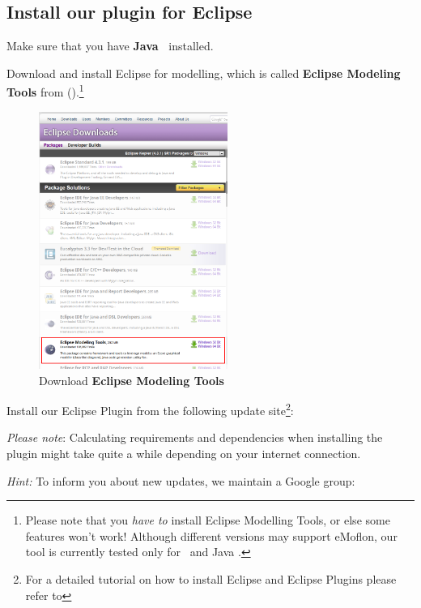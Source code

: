 \genHeader
\hypertarget{installPlugin common}{} 
\subsection{Install our plugin for Eclipse}
 
\vspace{0.5cm}
 
\begin{stepbystep}

\item  Make sure that you have \textbf{Java~\JavaVersion{}} installed.
 
\item  Download and install Eclipse \EclipseVersion for modelling, which is called \textbf{Eclipse Modeling Tools} from \EclipseDownloadLink ().\footnote{Please
note that you \emph{have to} install Eclipse Modelling Tools, or else some features won't work! Although different versions may support eMoflon, our tool is
currently tested only for \EclipseVersion~and Java \JavaVersion.} 

\begin{figure}[htbp]
	\centering
  	\includegraphics[width=0.55\textwidth]{../../org.moflon.doc.handbook.01_installation/1_installation/installPlugin/eclipseDownloadPage.png}
	\caption{Download \textbf{Eclipse Modeling Tools}}
	\label{eclipseDownload}
\end{figure}

\vspace{0.9cm}

\item  Install our Eclipse Plugin from the following update site\footnote{For a detailed tutorial on how to install Eclipse and Eclipse
Plugins please refer to }:\\ \eMoflonUpdateSite

\emph{Please note}: Calculating requirements and dependencies when
installing the plugin might take quite a while depending on your internet connection.

\emph{Hint:} To inform you about new updates, we maintain a Google group: 
\end{stepbystep}
